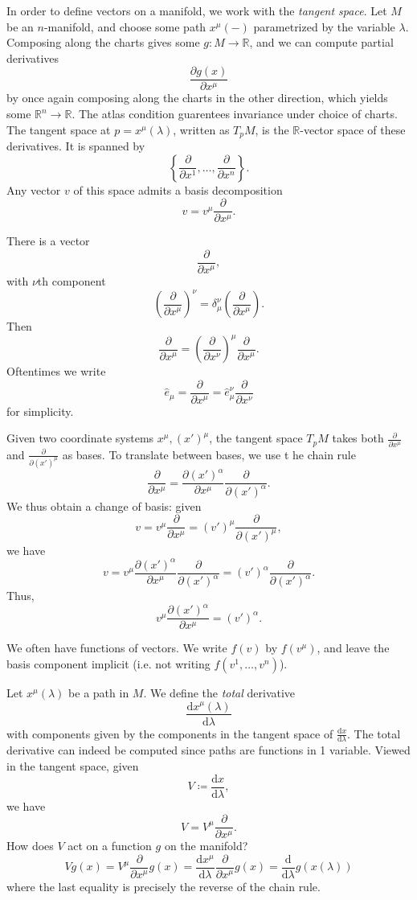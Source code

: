 
In order to define vectors on a manifold, we work with the \emph{tangent space}. Let $M$ be an $n$-manifold, and choose some path $x^\mu (-)$ parametrized by the variable $\lambda $. Composing along the charts gives some $g : M \to \mathbb{R} $, and we can compute partial derivatives
\[
	\frac{\partial g(x)}{\partial x^\mu } 
\]
by once again composing along the charts in the other direction, which yields some $\mathbb{R} ^n\to \mathbb{R} $. The atlas condition guarentees invariance under choice of charts. The tangent space at $p=x^\mu (\lambda )$, written as $T_pM$, is the $\mathbb{R} $-vector space of these derivatives. It is spanned by
\[
	\left\{ \frac{\partial }{\partial x^1} , \ldots , \frac{\partial }{\partial x^n}  \right\} 
.\]
Any vector $v$ of this space admits a basis decomposition
\[
	v=v^\mu \frac{\partial }{\partial x^\mu } 
.\]

There is a vector
\[
	\frac{\partial }{\partial x^\mu } 
,\]
with $\nu $th component
\[
	\left( \frac{\partial }{\partial x^\mu } \right) ^\nu =\delta _\mu^\nu \left( \frac{\partial }{\partial x^\mu }  \right) 
.\]
Then
\[
	\frac{\partial }{\partial x^\mu } =\left( \frac{\partial }{\partial x^\nu }  \right) ^\mu \frac{\partial }{\partial x^\mu } 
.\]
Oftentimes we write
\[
	\hat{e}_\mu =\frac{\partial }{\partial x^\mu } =\hat{e}_\mu ^\nu \frac{\partial }{\partial x^\nu } 
\]
for simplicity.

Given two coordinate systems $x^\mu ,(x')^\mu $, the tangent space $T_pM$ takes both $\frac{\partial }{\partial x^\mu } $ and $\frac{\partial }{\partial (x')^\mu } $ as bases. To translate between bases, we use t he chain rule
\[
	\frac{\partial }{\partial x^\mu } =\frac{\partial (x')^\alpha }{\partial x^\mu } \frac{\partial }{\partial (x')^\alpha } 
.\]
We thus obtain a change of basis: given
\[
	v=v^\mu \frac{\partial }{\partial x^\mu } =(v')^\mu \frac{\partial }{\partial (x')^\mu } ,
\]
we have
\[
	v=v^\mu \frac{\partial (x')^\alpha }{\partial x^\mu } \frac{\partial }{\partial (x')^\alpha } =(v')^\alpha \frac{\partial }{\partial (x')^\alpha } 
.\]
Thus,
\[
	v^\mu \frac{\partial (x')^\alpha }{\partial x^\mu } =(v')^\alpha 
.\]

We often have functions of vectors. We write $f(v)$ by $f(v^\mu )$, and leave the basis component implicit (i.e. not writing $f(v^1, \ldots ,v^n)$).

Let $x^\mu (\lambda )$ be a path in $M$. We define the \emph{total} derivative
\[
	\frac{\mathrm{d}x^\mu(\lambda ) }{\mathrm{d}\lambda } 
\]
with components given by the components in the tangent space of $\frac{\mathrm{d}x}{\mathrm{d}\lambda } $. The total derivative can indeed be computed since paths are functions in 1 variable. Viewed in the tangent space, given
\[
	V\coloneqq \frac{\mathrm{d}x}{\mathrm{d}\lambda } ,
\]
we have
\[
	V=V^\mu \frac{\partial }{\partial x^\mu } 
.\]
How does $V$ act on a function $g$ on the manifold?
\[
	Vg(x)=V^\mu \frac{\partial }{\partial x^\mu } g(x)=\frac{\mathrm{d}x^\mu }{\mathrm{d}\lambda } \frac{\partial }{\partial x^\mu } g(x)=\frac{\mathrm{d}}{\mathrm{d}\lambda } g(x(\lambda ))
\]
where the last equality is precisely the reverse of the chain rule.

